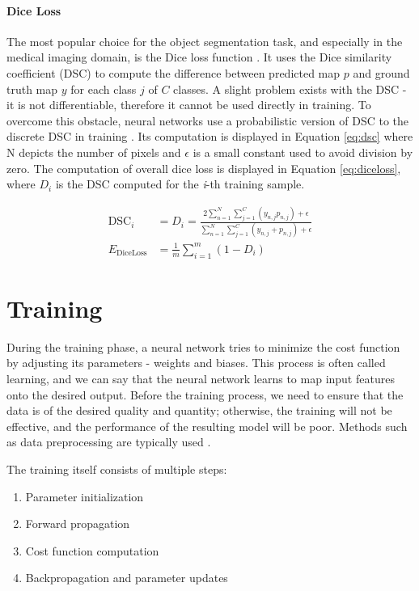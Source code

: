 \paragraph{Dice Loss}
The most popular choice for the object segmentation task, and especially in the medical imaging domain, is the Dice loss function \cite{Zhang2021}. It uses the Dice similarity coefficient (DSC) to compute the difference between predicted map $p$ and ground truth map $y$ for each class $j$ of $C$ classes. A slight problem exists with the DSC - it is not differentiable, therefore it cannot be used directly in training. To overcome this obstacle, neural networks use a probabilistic version of DSC to the discrete DSC in training \cite{Zhang2021}. Its computation is displayed in Equation \ref{eq:dsc} where N depicts the number of pixels and $\epsilon$ is a small constant used to avoid division by zero. The computation of overall dice loss is displayed in Equation \ref{eq:diceloss}, where $D_i$ is the DSC computed for the \textit{i}-th training sample.

\begin{align}
\label{eq:dsc}
\text{DSC}_i &= D_i = \frac{2 \sum_{n=1}^N \sum_{j=1}^C (y_{n,j} p_{n,j}) + \epsilon}{\sum_{n=1}^N\sum_{j=1}^C (y_{n,j} + p_{n,j}) + \epsilon} \\
\label{eq:diceloss}
E_\text{DiceLoss} &= \frac{1}{m}\sum_{i=1}^m (1-D_i)
\end{align}

\section{Training}
During the training phase, a neural network tries to minimize the cost function by adjusting its parameters - weights and biases. This process is often called learning, and we can say that the neural network learns to map input features onto the desired output. Before the training process, we need to ensure that the data is of the desired quality and quantity; otherwise, the training will not be effective, and the performance of the resulting model will be poor. Methods such as data preprocessing are typically used \cite{Goodfellow2016, LeCun2015}. 

The training itself consists of multiple steps:

\begin{enumerate}
    \item Parameter initialization
    \item Forward propagation
    \item Cost function computation
    \item Backpropagation and parameter updates
\end{enumerate}

